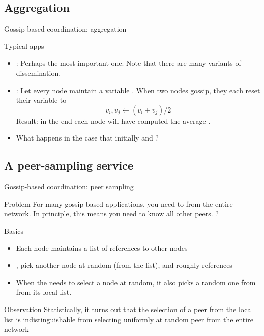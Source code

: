 \subsection{Aggregation}
\begin{slide}{Gossip-based coordination: aggregation}
  \begin{block}{Typical apps}
    \begin{itemize}
    \item {}: Perhaps the most important one. Note that there are many variants of
      dissemination.
    \item {}: Let every node  maintain a variable . When two nodes gossip, they
      each reset their variable to\[{v_i},{v_j} \leftarrow ({v_i} + {v_j}) /2\] Result: in the end
      each node will have computed the average .
    \item<2-> What happens in the case that initially  and ?
    \end{itemize}
  \end{block}
\end{slide}
\subsection{A peer-sampling service}
\begin{slide}{Gossip-based coordination: peer sampling}
  \begin{block}{Problem}
    For many gossip-based applications, you need to  from the entire
    network. In principle, this means you need to know all other peers. ?
  \end{block}
  \begin{block}{Basics}
    \begin{itemize}
    \item Each node maintains a list of  references to other nodes
    \item {}, pick another node at random (from the list), and  roughly
       references
    \item When the  needs to select a node at random, it also picks a random one from from
      its local list.
    \end{itemize}
  \end{block}
  \begin{alertblock}{Observation}
    Statistically, it turns out that the selection of a peer from the local list is indistinguishable from
    selecting uniformly at random peer from the entire network
  \end{alertblock}
\end{slide}

